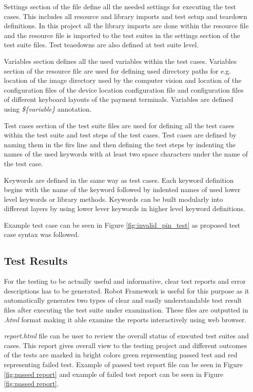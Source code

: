 Settings section of the file define all the needed settings for executing the test cases. This includes all resource and library imports and test setup and teardown definitions. In this project all the library imports are done within the resource file and the resource file is imported to the test suites in the settings section of the test suite files. Test teaedowns are also defined at test suite level.

Variables section defines all the used variables within the test cases. Variables section of the resource file are used for defining used directory paths for e.g. location of the image directory used by the computer vision and location of the configuration files of the device location configuration file and configuration files of different keyboard layouts of the payment terminals. Variables are defined using \emph{\$\{variable\}} annotation.

Test cases section of the test suite files are used for defining all the test cases within the test suite and test steps of the test cases. Test cases are defined by naming them in the firs line and then defining the test steps by indenting the names of the used keywords with at least two space characters under the name of the test case.
    
Keywords are defined in the same way as test cases. Each keyword definition begins with the name of the keyword followed by indented names of used lower level keywords or library methods. Keywords can be built modularly into different layers by using lower lever keywords in higher level keyword definitions.

Example test case can be seen in Figure \ref{fig:invalid_pin_test} as proposed test case syntax was followed.

\subsection{Test Results}
\label{subsection:Test result syntax}

For the testing to be actually useful and informative, clear test reports and error descriptions has to be generated. Robot Framework is useful for this purpose as it automatically generates two types of clear and easily understandable test result files after executing the test suite under examination. These files are outputted in \emph{.html} format making it able examine the reports interactively using web browser.

\emph{report.html} file can be user to review the overall status of executed test suites and cases. This report gives overall view to the testing project and different outcomes of the tests are marked in bright colors green representing passed test and red representing failed test. Example of passed test report file can be seen in Figure \ref{fig:passed report} and example of failed test report can be seen in Figure \ref{fig:passed report}.

